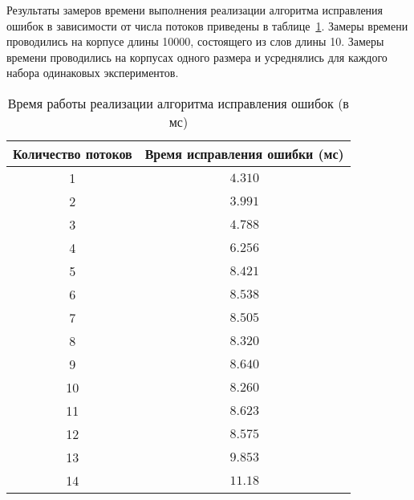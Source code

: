 Результаты замеров времени выполнения реализации алгоритма исправления ошибок в зависимости от числа потоков приведены в таблице~\ref{tbl:time_measurements}.
Замеры времени проводились на корпусе длины 10000, состоящего из слов длины 10. Замеры времени проводились на корпусах одного размера и усреднялись для каждого набора одинаковых экспериментов.

\begin{table}[H]
	\begin{center}
		\begin{threeparttable}
			\captionsetup{justification=raggedright,singlelinecheck=off}
			\caption{Время работы реализации алгоритма исправления ошибок (в мс)}
			\label{tbl:time_measurements}
			\begin{tabular}{|c|c|}
				\hline
				Количество потоков &  Время исправления ошибки (мс) \\
				\hline
			1 &$ 4.310 $\\
			\hline
			2 &$ 3.991 $\\
			\hline
			3 &$ 4.788 $\\
			\hline
			4 &$ 6.256 $\\
			\hline
			5 &$ 8.421 $\\
			\hline
			6 &$ 8.538 $\\
			\hline
			7 &$ 8.505 $\\
			\hline
			8 &$ 8.320 $\\
			\hline
			9 &$ 8.640 $\\
			\hline
			10 &$ 8.260 $\\
			\hline
			11 &$ 8.623 $\\
			\hline
			12 &$ 8.575 $\\
			\hline
			13 &$ 9.853 $\\
			\hline
			14 &$ 11.18$\\
			\hline
			\end{tabular}
		\end{threeparttable}
	\end{center}
\end{table}
	
